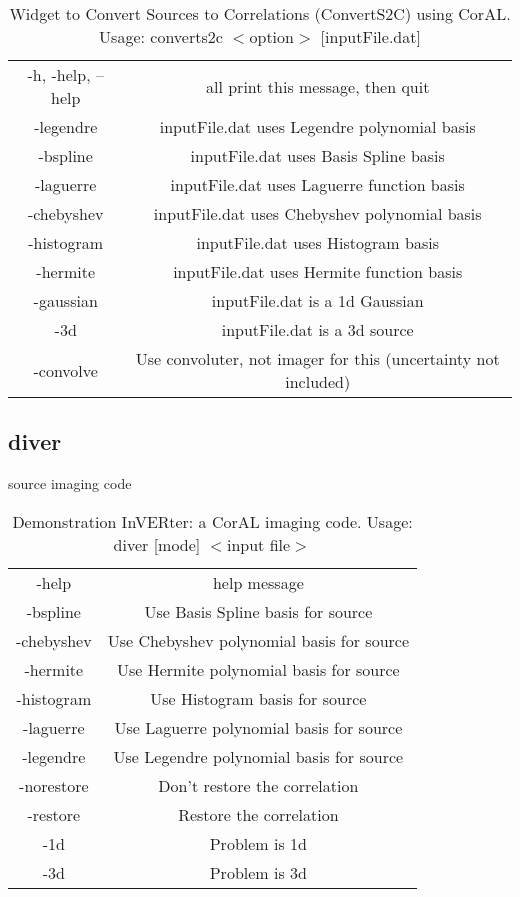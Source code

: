 \documentclass[10pt]{article}
\begin{document}
{\begin{table}[htdp]
\caption{Widget to Convert Sources to Correlations (ConvertS2C) using CorAL.  Usage: converts2c $<$option$>$ [inputFile.dat]}
\begin{center}
\begin{tabular}{|c|c|}
	-h, -help, --help & all print this message, then quit\\
 	-legendre   &    inputFile.dat uses Legendre polynomial basis\\
	-bspline      &  inputFile.dat uses Basis Spline basis\\
	-laguerre     &  inputFile.dat uses Laguerre function basis\\
	-chebyshev  &    inputFile.dat uses Chebyshev polynomial basis\\
	-histogram    &  inputFile.dat uses Histogram basis\\
	-hermite      &  inputFile.dat uses Hermite function basis\\
	-gaussian    &   inputFile.dat is a 1d Gaussian\\
	-3d           &  inputFile.dat is a 3d source\\
	-convolve   &    Use convoluter, not imager for this (uncertainty not included)
\end{tabular}
\end{center}
\label{converts2cCLOptions}
\end{table}


\subsection{diver}
source imaging code

\begin{table}[htdp]
\caption{Demonstration InVERter: a CorAL imaging code.  Usage:  diver [mode] $<$input file$>$}
\begin{center}
\begin{tabular}{|c|c|}
	-help & help message \\
	-bspline	& Use Basis Spline basis for source\\
	-chebyshev	& Use Chebyshev polynomial basis for source\\
	-hermite	& Use Hermite polynomial basis for source\\
	-histogram	& Use Histogram basis for source\\
	-laguerre	& Use Laguerre polynomial basis for source\\
	-legendre	& Use Legendre polynomial basis for source\\
	-norestore	& Don't restore the correlation\\
	-restore	& Restore the correlation\\
	-1d	& Problem is 1d\\
	-3d	& Problem is 3d
\end{tabular}
\end{center}
\label{default}
\end{table}%

}
\end{document}
